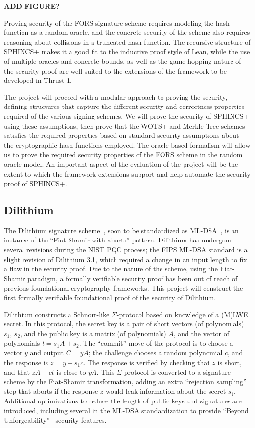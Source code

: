 \textbf{ADD FIGURE?}

Proving security of the FORS signature scheme requires modeling the hash function as a random oracle, and the concrete security of the scheme also requires reasoning about collisions in a truncated hash function.  The recursive structure of SPHINCS+ makes it a good fit to the inductive proof style of Lean, while the use of multiple oracles and concrete bounds, as well as the game-hopping nature of the security proof are well-suited to the extensions of the \vcvio framework to be developed in Thrust 1.

The project will proceed with a modular approach to proving the security, defining  structures that capture the different security and correctness properties required of the various signing schemes.  
We will prove the security of SPHINCS+ using these assumptions, then prove that the WOTS+ and Merkle Tree schemes satisfies the required properties based on standard security assumptions about the cryptographic hash functions employed.
The \vcvio oracle-based formalism will allow us to prove the required security properties of the FORS scheme in the random oracle model.
An important aspect of the evaluation of the project will be the extent to which the \vcvio framework extensions support and help automate the security proof of SPHINCS+.


\subsection{Dilithium}

The Dilithium signature scheme~\cite{dilithum}, soon to be standardized as ML-DSA~\cite{ML-DSA}, is an instance of the ``Fiat-Shamir with aborts'' pattern.  
Dilithium has undergone several revisions during the NIST PQC process; the FIPS ML-DSA standard is a slight revision of Dilithium 3.1, which required a change in an input length to fix a flaw in the security proof.  
Due to the nature of the scheme, using the  Fiat-Shamir paradigm, a formally verifiable security proof has been out of reach of previous foundational cryptography frameworks.  
This project will construct the first formally verifiable foundational proof of the security of Dilithium.

Dilithium constructs a Schnorr-like $\Sigma$-protocol based on knowledge of a (M)LWE secret.  
In this protocol, the secret key is a pair of short vectors (of polynomials) $s_1$, $s_2$, and the public key is a matrix (of polynomials) $A$, and the vector of polynomials $t = s_1A + s_2$.  
The ``commit'' move of the protocol is to choose a vector $y$ and output $C = yA$; the challenge chooses a random polynomial $c$, and the response is $z = y + s_1c$.  
The response is verified by checking that $z$ is short, and that $zA - ct$ is close to $yA$.  
This $\Sigma$-protocol is converted to a signature scheme by the Fiat-Shamir transformation, adding an extra ``rejection sampling'' step that aborts if the response $z$ would leak information about the secret $s_1$.   
Additional optimizations to reduce the length of public keys and signatures are introduced, including several in the ML-DSA standardization to provide ``Beyond Unforgeability''~\cite{BUFF} security features.

